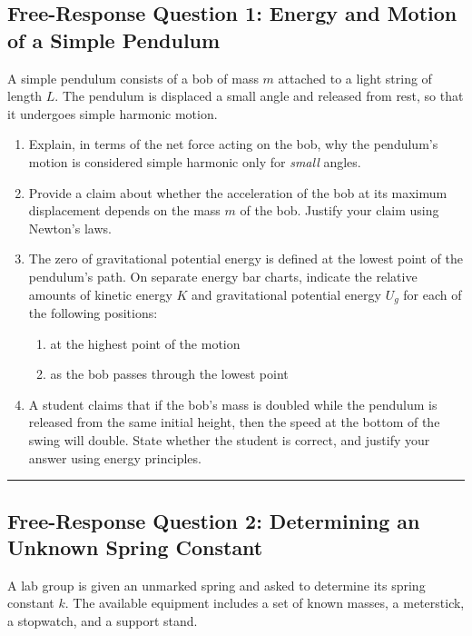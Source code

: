 \documentclass[12pt]{article}
\begin{document}
\subsection*{Free-Response Question 1: Energy and Motion of a Simple Pendulum}

A simple pendulum consists of a bob of mass $m$ attached to a light string of length $L$. The pendulum is displaced a small angle and released from rest, so that it undergoes simple harmonic motion.

\begin{enumerate}[label=\textbf{(\alph*)}]
\item Explain, in terms of the net force acting on the bob, why the pendulum's motion is considered simple harmonic only for \textit{small} angles.

\item Provide a claim about whether the acceleration of the bob at its maximum displacement depends on the mass $m$ of the bob. Justify your claim using Newton's laws.

\item The zero of gravitational potential energy is defined at the lowest point of the pendulum's path. On separate energy bar charts, indicate the relative amounts of kinetic energy $K$ and gravitational potential energy $U_g$ for each of the following positions:
\begin{enumerate}[label=\textbf{\roman*.}]
\item at the highest point of the motion
\item as the bob passes through the lowest point
\end{enumerate}

\item A student claims that if the bob's mass is doubled while the pendulum is released from the same initial height, then the speed at the bottom of the swing will double. State whether the student is correct, and justify your answer using energy principles.
\end{enumerate}

\hrule

\subsection*{Free-Response Question 2: Determining an Unknown Spring Constant}

A lab group is given an unmarked spring and asked to determine its spring constant $k$. The available equipment includes a set of known masses, a meterstick, a stopwatch, and a support stand.
\end{document}
